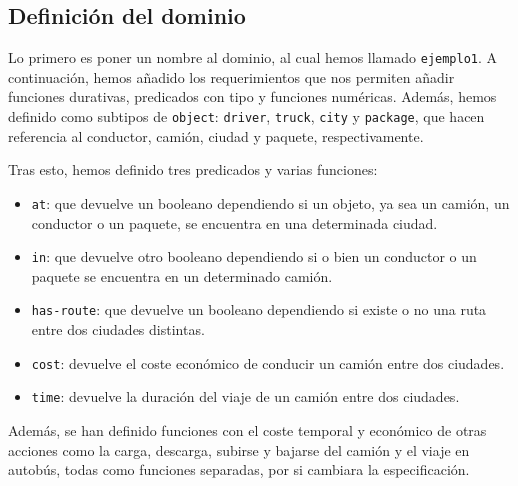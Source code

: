 \documentclass[a4paper]{article}
\begin{document}
\subsection{Definición del dominio}
Lo primero es poner un nombre al dominio, al cual hemos llamado \texttt{ejemplo1}. A continuación, hemos añadido los requerimientos que nos permiten añadir funciones durativas, predicados con tipo y funciones numéricas. Además, hemos definido como subtipos de \texttt{object}: \texttt{driver}, \texttt{truck}, \texttt{city} y \texttt{package}, que hacen referencia al conductor, camión, ciudad y paquete, respectivamente.

Tras esto, hemos definido tres predicados y varias funciones:
\begin{itemize}
\item \texttt{at}: que devuelve un booleano dependiendo si un objeto, ya sea un camión, un conductor o un paquete, se encuentra en una determinada ciudad.
\item \texttt{in}: que devuelve otro booleano dependiendo si o bien un conductor o un paquete se encuentra en un determinado camión.
\item \texttt{has-route}: que devuelve un booleano dependiendo si existe o no una ruta entre dos ciudades distintas.
\item \texttt{cost}: devuelve el coste económico de conducir un camión entre dos ciudades.
\item \texttt{time}: devuelve la duración del viaje de un camión entre dos ciudades.
\end{itemize}
Además, se han definido funciones con el coste temporal y económico de otras acciones como la carga, descarga, subirse y bajarse del camión y el viaje en autobús, todas como funciones separadas, por si cambiara la especificación.
\end{document}
